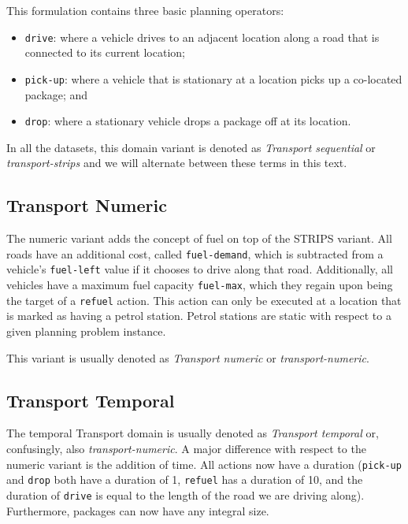 This formulation contains three basic planning operators:

\begin{itemize}
\item \verb+drive+: where a vehicle drives to an adjacent location
along a road that is connected to its current location;
\item \verb+pick-up+: where a vehicle that is stationary at a location picks up a co-located package; and
\item \verb+drop+: where a stationary vehicle drops a package off at its location.
\end{itemize}

In all the datasets, this domain variant is denoted as \textit{Transport sequential}
or \textit{transport-strips} and we will alternate between these terms in this text.

\subsection{Transport Numeric}\label{transport-numeric}

The numeric variant adds the concept of fuel on top of the STRIPS variant.
All roads have an additional cost, called \verb+fuel-demand+, which is
subtracted from a vehicle's \verb+fuel-left+ value if it chooses to drive along that road.
Additionally, all vehicles have a maximum fuel capacity \verb+fuel-max+,
which they regain upon being the target of a \verb+refuel+ action. This action can only
be executed at a location that is marked as having a petrol station. Petrol stations
are static with respect to a given planning problem instance.

This variant is usually denoted as \textit{Transport numeric} or \textit{transport-numeric}.

\subsection{Transport Temporal}\label{transport-temporal}

The temporal Transport domain is usually denoted as \textit{Transport temporal} or, confusingly,
also \textit{transport-numeric}. A major difference with respect to the numeric variant is
the addition of time. All actions now have a duration (\verb+pick-up+ and \verb+drop+ both have a
duration of 1, \verb+refuel+ has a duration of 10, and the duration of \verb+drive+ is
equal to the length of the road we are driving along). Furthermore, packages can now have any integral size.

